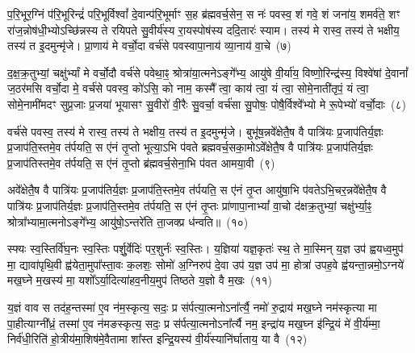 {\anuvakamend[{अप॑श्यन्तो\-ऽग्नीषो॒मीय॑मा॒त्मना॒ परा॒ त्रीणि॑ च}]}%

प॒रि॒भूर॒ग्निं प॑रि॒भूरिन्द्रं॑ परि॒भूर्विश्वां᳚ दे॒वान्प॑रि॒भूर्माꣳ स॒ह ब्र॑ह्मवर्च॒सेन॒ स नः॑ पवस्व॒ शं गवे॒ शं जना॑य॒ शमर्व॑ते॒ शꣳ रा॑ज॒न्नोष॑धी॒भ्यो\-ऽच्छि॑न्नस्य ते रयिपते सु॒वीर्य॑स्य रा॒यस्पोष॑स्य ददि॒तारः॑ स्याम। तस्य॑ मे रास्व॒ तस्य॑ ते भक्षीय॒ तस्य॑ त इ॒दमुन्मृ॑जे। प्रा॒णाय॑ मे वर्चो॒दा वर्च॑से पवस्वापा॒नाय॑ व्या॒नाय॑ वा॒चे~(७)

द॒क्ष॒क्र॒तुभ्यां॒ चक्षु॑र्भ्यां मे वर्चो॒दौ वर्च॑से पवेथा॒ꣴ॒ श्रोत्रा॑या॒त्मने\-ऽङ्गे᳚भ्य॒ आयु॑षे वी॒र्या॑य॒ विष्णो॒रिन्द्र॑स्य॒ विश्वे॑षां दे॒वानां᳚ ज॒ठर॑मसि वर्चो॒दा मे॒ वर्च॑से पवस्व॒ को॑\-ऽसि॒ को नाम॒ कस्मै᳚ त्वा॒ काय॑ त्वा॒ यं त्वा॒ सोमे॒नाती॑तृपं॒ यं त्वा॒ सोमे॒नामी॑मदꣳ सुप्र॒जाः प्र॒जया॑ भूयासꣳ सु॒वीरो॑ वी॒रैः सु॒वर्चा॒ वर्च॑सा सु॒पोषः॒ पोषै॒र्विश्वे᳚भ्यो मे रू॒पेभ्यो॑ वर्चो॒दाः~(८)

वर्च॑से पवस्व॒ तस्य॑ मे रास्व॒ तस्य॑ ते भक्षीय॒ तस्य॑ त इ॒दमुन्मृ॑जे। बुभू॑ष॒न्नवे᳚क्षेतै॒ष वै पात्रि॑यः प्र॒जाप॑तिर्य॒ज्ञः प्र॒जाप॑ति॒स्तमे॒व त॑र्पयति॒ स ए॑नं तृ॒प्तो भूत्या॒\-ऽभि प॑वते ब्रह्मवर्च॒सका॒मो\-ऽवे᳚क्षेतै॒ष वै पात्रि॑यः प्र॒जाप॑तिर्य॒ज्ञः प्र॒जाप॑तिस्तमे॒व त॑र्पयति॒ स ए॑नं तृ॒प्तो ब्र॑ह्मवर्च॒सेना॒भि प॑वत आमया॒वी~(९)

अवे᳚क्षेतै॒ष वै पात्रि॑यः प्र॒जाप॑तिर्य॒ज्ञः प्र॒जाप॑ति॒स्तमे॒व त॑र्पयति॒ स ए॑नं तृ॒प्त आयु॑षा॒भि प॑वते\-ऽभि॒चर॒न्नवे᳚क्षेतै॒ष वै पात्रि॑यः प्र॒जाप॑तिर्य॒ज्ञः प्र॒जाप॑ति॒स्तमे॒व त॑र्पयति॒ स ए॑नं तृ॒प्तः प्रा॑णापा॒ना\-भ्यां᳚ वा॒चो द॑क्षक्र॒तुभ्यां॒ चक्षु॑र्भ्या॒ꣴ॒ श्रोत्रा᳚भ्यामा॒त्मनो\-ऽङ्गे᳚भ्य॒ आयु॑षो॒\-ऽन्तरे॑ति ता॒जक्प्र ध॑न्वति॥~(१०)

{\anuvakamend[{वा॒चे रू॒पेभ्यो॑ वर्चो॒दा आ॑मया॒वी पञ्च॑चत्वारिꣳशच्च}]}%

स्फ्यः स्व॒स्तिर्वि॑घ॒नः स्व॒स्तिः पर्\mbox{}शु॒र्वेदिः॑ पर॒शुर्नः॑ स्व॒स्तिः। य॒ज्ञिया॑ यज्ञ॒कृतः॑ स्थ॒ ते मा॒स्मिन् य॒ज्ञ उप॑ ह्वयध्व॒मुप॑ मा॒ द्यावा॑पृथि॒वी ह्व॑येता॒मुपा᳚स्ता॒वः क॒लशः॒ सोमो॑ अ॒ग्निरुप॑ दे॒वा उप॑ य॒ज्ञ उप॑ मा॒ होत्रा॑ उपह॒वे ह्व॑यन्ता॒न्नमो॒\-ऽग्नये॑ मख॒घ्ने म॒खस्य॑ मा॒ यशो᳚\-ऽर्या॒दित्या॑हव॒नीय॒मुप॑ तिष्ठते य॒ज्ञो वै म॒खः~(११)

य॒ज्ञं वाव स तद॑ह॒न्तस्मा॑ ए॒व न॑म॒स्कृत्य॒ सदः॒ प्र स॑र्पत्या॒त्मनो\-ऽना᳚र्त्यै॒ नमो॑ रु॒द्राय॑ मख॒घ्ने नम॑स्कृत्या मा पा॒हीत्याग्नी᳚ध्रं॒ तस्मा॑ ए॒व न॑मङस्कृत्य॒ सदः॒ प्र स॑र्पत्या॒त्मनो\-ऽना᳚र्त्यै नम॒ इन्द्रा॑य मख॒घ्न इ॑न्द्रि॒यं मे॑ वी॒र्य॑म्मा॒ निर्व॑धी॒रिति॑ हो॒त्रीय॑मा॒शिष॑मे॒वैतामा शा᳚स्त इन्द्रि॒यस्य॑ वी॒र्य॑स्यानि॑र्घाताय॒ या वै~(१२)

